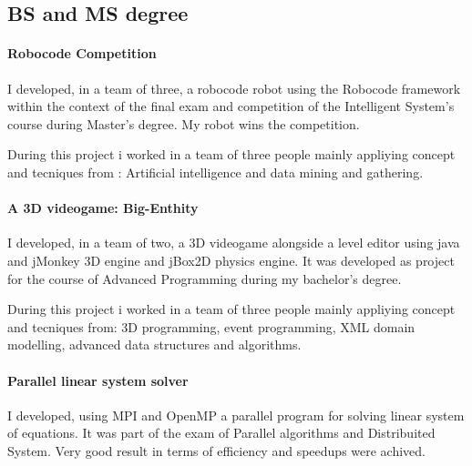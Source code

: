 \documentclass[a4paper,10pt]{article}
\begin{document}
 \subsection{BS and MS degree}

\paragraph{Robocode Competition} 
I developed, in a team of three, a robocode robot using the Robocode framework
within the context of the final exam and competition of the Intelligent System's
course during Master's degree. My robot wins the competition.

\noindent During this project i worked in a team of three people mainly
appliying concept and tecniques from :
\noindent Artificial intelligence and data mining and gathering.
 

 \paragraph{A 3D videogame: Big-Enthity } 

I developed, in a team of two, a 3D videogame alongside a level editor using
java and jMonkey 3D engine and jBox2D physics engine.
It was developed as project for the course of Advanced Programming during my
bachelor's degree.

\noindent During this project i worked in a team of three people mainly
appliying concept and tecniques from:
\noindent 3D programming, event programming, XML domain modelling, advanced
data structures and algorithms.

 \paragraph{Parallel linear system solver} 

I developed, using MPI and OpenMP a  parallel program for solving linear system
of equations. It was part of the exam of Parallel algorithms and
Distribuited System. Very good result in terms of efficiency and speedups were
achived.
\end{document}
